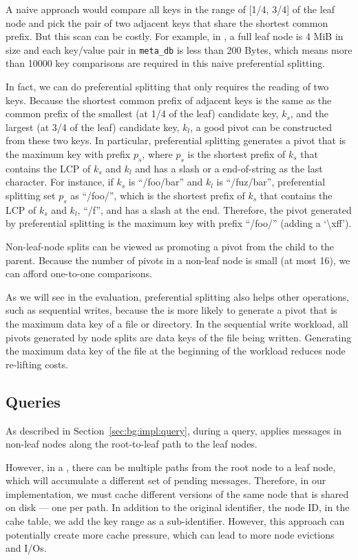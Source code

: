 A naive approach would compare all keys in the range of [1/4, 3/4] of the leaf
node and pick the pair of two adjacent keys that share the shortest common
prefix.
But this scan can be costly.
For example, in \betrfs, a full leaf node is 4 MiB in size and each key/value pair in
\texttt{meta\_db} is less than 200 Bytes, which means more than 10000 key
comparisons are required in this naive preferential splitting.

In fact, we can do preferential splitting that only requires the reading of two keys.
Because the shortest common prefix of adjacent keys is the same as the common
prefix of the smallest (at 1/4 of the leaf) candidate key, $k_{s}$, and
the largest (at 3/4 of the leaf) candidate key, $k_{l}$,
a good pivot can be constructed from these two keys.
In particular, preferential splitting generates a pivot that is the maximum key
with prefix $p_{s}$, where $p_{s}$ is the shortest prefix of $k_{s}$ that
contains the LCP of $k_{s}$ and $k_{l}$ and has a slash or a end-of-string as
the last character.
For instance, if $k_{s}$ is ``/foo/bar'' and $k_{l}$ is ``/fuz/bar'',
preferential splitting set $p_{s}$ as ``/foo/'', which is the shortest prefix
of $k_{s}$ that contains the LCP of $k_{s}$ and $k_{l}$, ``/f'', and has a
slash at the end.
Therefore, the pivot generated by preferential splitting is the maximum key with
prefix ``/foo/'' (adding a `\textbackslash xff').

Non-leaf-node splits can be viewed as promoting a pivot from the child to the
parent.
Because the number of pivots in a non-leaf node is small (at most 16), we can
afford one-to-one comparisons.

As we will see in the evaluation, preferential splitting also helps
other operations, such as sequential writes, because the \bet is more likely
to generate a pivot that is the maximum data key of a file or directory.
In the sequential write workload, all pivots generated by node splits are
data keys of the file being written.
Generating the maximum data key of the file at the beginning of the workload
reduces node re-lifting costs.

\subsection{Queries}

As described in Section~\ref{sec:bg:impl:query}, during a query,
\fti applies messages in non-leaf nodes along the root-to-leaf path to the
leaf nodes.

However, in a \bedag,
there can be multiple paths from the root node to a leaf node,
which will accumulate a different set of pending messages.
Therefore, in our implementation,
we must cache different versions of the same node that is shared on disk --- one per path.
In addition to the original identifier, the node ID, in the cahe table,
we add the key range as a sub-identifier.
However, this approach can potentially create more cache pressure,
which can lead to more node evictions and I/Os.

